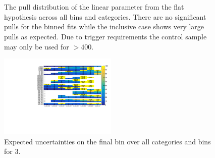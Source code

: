 \begin{figure}[h!]
  \centering
  ~~
  \\
  ~~
  \\
  \caption{\label{fig:frenchFlagPulls13} The pull distribution of the linear parameter from the flat hypothesis across all
  \scalht bins and categories. There are no significant pulls for the \scalht binned
  fits while the \scalht inclusive case shows very large pulls as expected. 
  Due to trigger requirements the \gj control sample may only be used for \scalht $> 400$\GeV.}
\end{figure}
\begin{figure}[]
  \centering
  \includegraphics[width=0.5\textwidth]{figures/template/frenchFlagLastBin.pdf}
  \caption{\label{fig:frenchFlagLastBin} Expected uncertainties on the final bin
over all categories and \scalht bins for 3\ifb.}
\end{figure}
